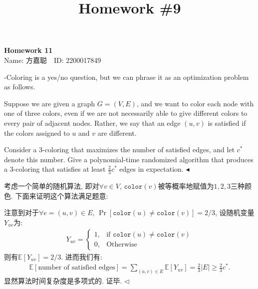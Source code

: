 \documentclass[11pt]{article}
\title{Homework \#9}
\newenvironment{problem}[2][Problem]{\begin{trivlist}
    \item[\hskip \labelsep{\bfseries#1}\hskip\labelsep{\bfseries#2.}]\mbox{}\newline}{\hfill$\blacktriangleleft$\end{trivlist}}
\newenvironment{answer}[1][Solution]{\begin{trivlist}
\item[\hskip \labelsep{\bfseries#1.}\hskip \labelsep]}{\hfill$\lhd$\end{trivlist}}
\newcommand\E{\mathbb{E}}
\begin{document}
\kaishu

\pagestyle{fancy}
\chead{}

\begin{center}
    {\LARGE \bf Homework 11}\\
    {Name: 方嘉聪\ \  ID: 2200017849}            %
\end{center}

\begin{problem}{1.(Max 3-Coloring)}
3-Coloring is a yes/no question, but we can phrase it as an optimization problem as follows.

Suppose we are given a graph $G = (V, E)$, and we want to color each node with one of three colors, even if we are not necessarily able to give different colors to every pair of adjacent nodes. Rather, we say that an edge $(u, v)$ is satisfied if the colors assigned to $u$ and $v$ are different.

Consider a 3-coloring that maximizes the number of satisfied edges, and let $c^{*}$ denote this number. Give a polynomial-time randomized algorithm that produces a 3-coloring that satisfies at least $\frac{2}{3}c^{*}$ edges in expectation.
\end{problem}
\begin{answer}
    考虑一个简单的随机算法, 即对$\forall v \in V$, $\texttt{color}(v)$被等概率地赋值为$1, 2, 3$三种颜色. 下面来证明这个算法满足题意:
    
    注意到对于$\forall e = (u,v) \in E$, $\Pr[\texttt{color}(u) \neq \texttt{color}(v)] = 2/3$, 设随机变量$Y_{uv}$为:
    \begin{align*}
        Y_{uv} = \begin{cases}
            1, & \text{if } \texttt{color}(u) \neq \texttt{color}(v) \\
            0, & \text{Otherwise}
        \end{cases}
    \end{align*}
    则有$\E[Y_{uv}] = 2/3$. 进而我们有:
    \begin{align*}
        \E[\text{number of satisfied edges}] = \sum_{(u,v) \in E} \E[Y_{uv}] = \frac{2}{3}|E| \ge \frac{2}{3}c^*.
    \end{align*}
    显然算法时间复杂度是多项式的. 证毕.
\end{answer}
\end{document}
